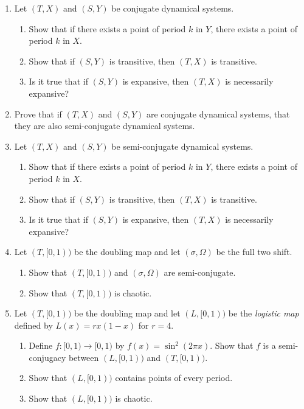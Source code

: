 \documentclass[letter]{article}
\begin{document}
\begin{enumerate}
		\begin{enumerate}
			\item Let $(T,X)$ and $(S,Y)$ be conjugate dynamical systems.
				\begin{enumerate}
					\item Show that if there exists a point of period $k$ in $Y$, there exists a point
						of period $k$ in $X$.
					\item Show that if $(S,Y)$ is transitive, then $(T,X)$ is transitive.
					\item Is it true that if $(S,Y)$ is expansive, then $(T,X)$ is necessarily expansive?
				\end{enumerate}
			\item Prove that if $(T,X)$ and $(S,Y)$ are conjugate dynamical systems, that they are also semi-conjugate dynamical
				systems.
			\item Let $(T,X)$ and $(S,Y)$ be semi-conjugate dynamical systems.
				\begin{enumerate}
					\item Show that if there exists a point of period $k$ in $Y$, there exists a point
						of period $k$ in $X$.
					\item Show that if $(S,Y)$ is transitive, then $(T,X)$ is transitive.
					\item Is it true that if $(S,Y)$ is expansive, then $(T,X)$ is necessarily expansive?
				\end{enumerate}
			\item Let $(T,[0,1))$ be the doubling map and let $(\sigma, \Omega)$ be the full two shift.
				\begin{enumerate}
					\item Show that $(T,[0,1))$ and $(\sigma, \Omega)$ are semi-conjugate.
					\item Show that $(T,[0,1))$ is chaotic.
				\end{enumerate}
			\item Let $(T,[0,1))$ be the doubling map and let $(L,[0,1))$ be the \emph{logistic map} defined by
				$L(x)=rx(1-x)$ for $r=4$.
				\begin{enumerate}
					\item Define $f:[0,1)\to[0,1)$ by $f(x)=\sin^2(2\pi x)$. Show that $f$ is a semi-conjugacy
						between $(L,[0,1))$ and $(T,[0,1))$.
					\item Show that $(L,[0,1))$ contains points of every period.
					\item Show that $(L,[0,1))$ is chaotic.
				\end{enumerate}
		\end{enumerate}

	\end{enumerate}
\end{document}
